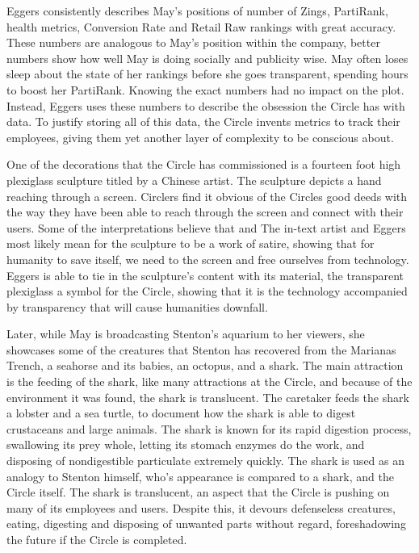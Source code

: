 Eggers consistently describes May's positions of number of Zings, PartiRank, health metrics, Conversion Rate and Retail Raw rankings with great accuracy.
These numbers are analogous to May's position within the company, better numbers show how well May is doing socially and publicity wise.
May often loses sleep about the state of her rankings before she goes transparent, spending hours to boost her PartiRank.
Knowing the exact numbers had no impact on the plot.
Instead, Eggers uses these numbers to describe the obsession the Circle has with data.
To justify storing all of this data, the Circle invents metrics to track their employees, giving them yet another layer of complexity to be conscious about.

One of the decorations that the Circle has commissioned is a fourteen foot high plexiglass sculpture titled  \autocite[190]{eggers1} by a Chinese artist.
The sculpture depicts a hand reaching through a screen.
Circlers find it obvious of the Circles good deeds with the way they have been able to reach through the screen and connect with their users.
Some of the interpretations believe that  \autocite[190]{eggers1} and  \autocite[190]{eggers1}
The in-text artist and Eggers most likely mean for the sculpture to be a work of satire, showing that for humanity to save itself, we need to  the screen and free ourselves from technology.
Eggers is able to tie in the sculpture's content with its material, the transparent plexiglass a symbol for the Circle, showing that it is the technology accompanied by transparency that will cause humanities downfall.

Later, while May is broadcasting Stenton's aquarium to her viewers, she showcases some of the creatures that Stenton has recovered from the Marianas Trench, a seahorse and its babies, an octopus, and a shark.
The main attraction is the feeding of the shark, like many attractions at the Circle, and because of the environment it was found, the shark is translucent.
The caretaker feeds the shark a lobster and a sea turtle, to document how the shark is able to digest crustaceans and large animals.
The shark is known for its rapid digestion process, swallowing its prey whole, letting its stomach enzymes do the work, and disposing of nondigestible particulate extremely quickly.
The shark is used as an analogy to Stenton himself, who's appearance is compared to a shark, and the Circle itself.
The shark is translucent, an aspect that the Circle is pushing on many of its employees and users.
Despite this, it devours defenseless creatures, eating, digesting and disposing of unwanted parts without regard, foreshadowing the future if the Circle is completed.

